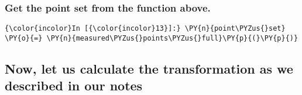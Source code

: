     \subsubsection{Get the point set from the function
above.}\label{get-the-point-set-from-the-function-above.}

    \begin{Verbatim}[commandchars=\\\{\}]
{\color{incolor}In [{\color{incolor}13}]:} \PY{n}{point\PYZus{}set} \PY{o}{=} \PY{n}{measured\PYZus{}points\PYZus{}full}\PY{p}{(}\PY{p}{)}
\end{Verbatim}


    \subsection{Now, let us calculate the transformation as we described in
our
notes}\label{now-let-us-calculate-the-transformation-as-we-described-in-our-notes}

